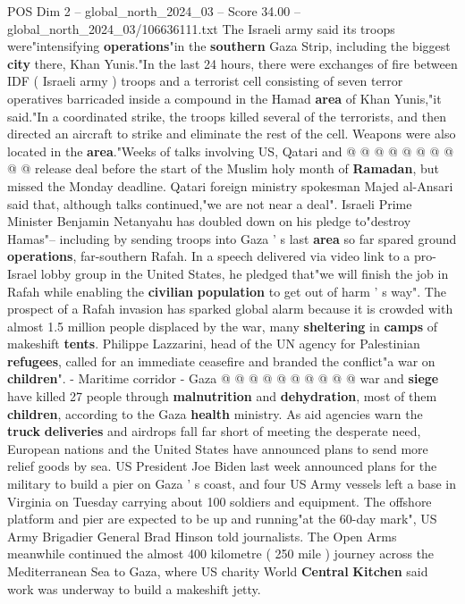 \begin{textsample}{POS Dim 2 – global\_north\_2024\_03 – Score 34.00 – global\_north\_2024\_03/106636111.txt}
The Israeli army said its troops were"intensifying \textbf{operations}"in the \textbf{southern} Gaza Strip, including the biggest \textbf{city} there, Khan Yunis."In the last 24 hours, there were exchanges of fire between IDF ( Israeli army ) troops and a terrorist cell consisting of seven terror operatives barricaded inside a compound in the Hamad \textbf{area} of Khan Yunis,"it said."In a coordinated strike, the troops killed several of the terrorists, and then directed an aircraft to strike and eliminate the rest of the cell.
Weapons were also located in the \textbf{area}."Weeks of talks involving US, Qatari and @ @ @ @ @ @ @ @ @ @ release deal before the start of the Muslim holy month of \textbf{Ramadan}, but missed the Monday deadline.
Qatari foreign ministry spokesman Majed al-Ansari said that, although talks continued,"we are not near a deal".
Israeli Prime Minister Benjamin Netanyahu has doubled down on his pledge to"destroy Hamas"-- including by sending troops into Gaza ' s last \textbf{area} so far spared ground \textbf{operations}, far-southern Rafah.
In a speech delivered via video link to a pro-Israel lobby group in the United States, he pledged that"we will finish the job in Rafah while enabling the \textbf{civilian} \textbf{population} to get out of harm ' s way".
The prospect of a Rafah invasion has sparked global alarm because it is crowded with almost 1.5 million people displaced by the war, many \textbf{sheltering} in \textbf{camps} of makeshift \textbf{tents}.
Philippe Lazzarini, head of the UN agency for Palestinian \textbf{refugees}, called for an immediate ceasefire and branded the conflict"a war on \textbf{children}". - Maritime corridor - Gaza @ @ @ @ @ @ @ @ @ @ war and \textbf{siege} have killed 27 people through \textbf{malnutrition} and \textbf{dehydration}, most of them \textbf{children}, according to the Gaza \textbf{health} ministry.
As aid agencies warn the \textbf{truck} \textbf{deliveries} and airdrops fall far short of meeting the desperate need, European nations and the United States have announced plans to send more relief goods by sea.
US President Joe Biden last week announced plans for the military to build a pier on Gaza ' s coast, and four US Army vessels left a base in Virginia on Tuesday carrying about 100 soldiers and equipment.
The offshore platform and pier are expected to be up and running"at the 60-day mark", US Army Brigadier General Brad Hinson told journalists.
The Open Arms meanwhile continued the almost 400 kilometre ( 250 mile ) journey across the Mediterranean Sea to Gaza, where US charity World \textbf{Central} \textbf{Kitchen} said work was underway to build a makeshift jetty.

\end{textsample}
